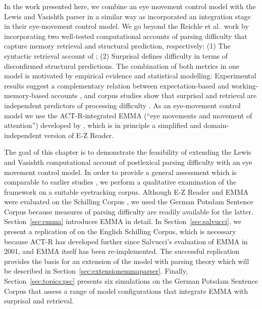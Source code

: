 In the work presented here, we combine an eye movement control model with the Lewis and Vasishth parser in a similar way as \cite{ReichleWarrenMcConnell2009} incorporated an integration stage in their eye-movement control model. We go beyond the Reichle et al.\ work by incorporating two well-tested computational accounts of parsing difficulty that capture  memory retrieval and  structural prediction, respectively: (1) The syntactic retrieval account of \cite{LewisVasishth2005}; (2) Surprisal \cite{Hale2001,Levy2008} defines difficulty in terms of disconfirmed structural predictions.
The combination of both metrics in one model is motivated by empirical evidence and statistical modelling: Experimental results suggest a complementary relation between expectation-based and working-memory-based accounts \citep{Demberg2008,Konieczny2000,Vasishth2011,Staub2010a}, and corpus studies show that surprisal and retrieval are independent predictors of processing difficulty \citep{jemrsurprisal,BostonHaleVasishth2011,Patil2009,VasishthLewis2006}. 
As an eye-movement control model we use the ACT-R-integrated EMMA   (``eye movements and movement of attention'') developed by \cite{Salvucci2001}, which is in principle a simplified and domain-independent version of E-Z Reader.

The goal of this chapter is to demonstrate the feasibility of extending the Lewis and Vasishth computational account of postlexical parsing difficulty with an eye movement control model.   In order to provide a general assessment which is comparable to earlier studies \citep{Reichle1998,ReichleWarrenMcConnell2009,Salvucci2001}, we perform a qualitative examination of the framework on a suitable eyetracking corpus.  Although E-Z Reader and EMMA were evaluated on the Schilling Corpus \cite{Schilling1998}, we used the German Potsdam Sentence Corpus \cite{Kliegl2004} because measures of parsing difficulty are readily available for the latter.
Section~\ref{sec:emma} introduces EMMA in detail.  In Section~\ref{sec:salvucci}, we present a replication of \cite{Salvucci2001} on the English Schilling Corpus, which is necessary because ACT-R has developed further since Salvucci's evaluation of EMMA in 2001, and EMMA itself has been re-implemented.  The successful replication provides the basis for an extension of the model with parsing theory which will be described in Section~\ref{sec:extensionemmaparser}.  Finally, Section~\ref{sec:topics:psc} presents six simulations on the German Potsdam Sentence Corpus that assess a range of model configurations that integrate EMMA with surprisal and retrieval.

